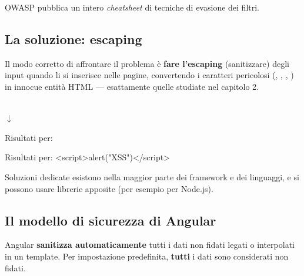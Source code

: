 OWASP pubblica un intero \textit{cheatsheet} di tecniche di evasione dei filtri.


\subsection{La soluzione: escaping}

Il modo corretto di affrontare il problema è \textbf{fare l'escaping}
(sanitizzare) degli input quando li si inserisce nelle pagine, convertendo i
caratteri pericolosi (\code{<}, \code{>}, , ) in innocue entità
HTML --- esattamente quelle studiate nel capitolo 2.

\begin{affianco}[0.5][c]
\begin{center}\footnotesize
   \\[3pt]
  $\downarrow$ \\[3pt]
\end{center}
\risultato
\renewcommand{\wtdialogohost}{shop.example.com}
\begin{browser}
  Risultati per: \par\vspace{4pt}
\end{browser}
\begin{browser}
  Risultati per: {\ttfamily <script>alert("XSS")</script>}
\end{browser}
\end{affianco}

Soluzioni dedicate esistono nella maggior parte dei framework e dei linguaggi, e
si possono usare librerie apposite (per esempio  per Node.js).

\subsection{Il modello di sicurezza di Angular}

Angular \textbf{sanitizza automaticamente} tutti i dati non fidati legati o
interpolati in un template. Per impostazione predefinita, \textbf{tutti} i dati
sono considerati non fidati.

